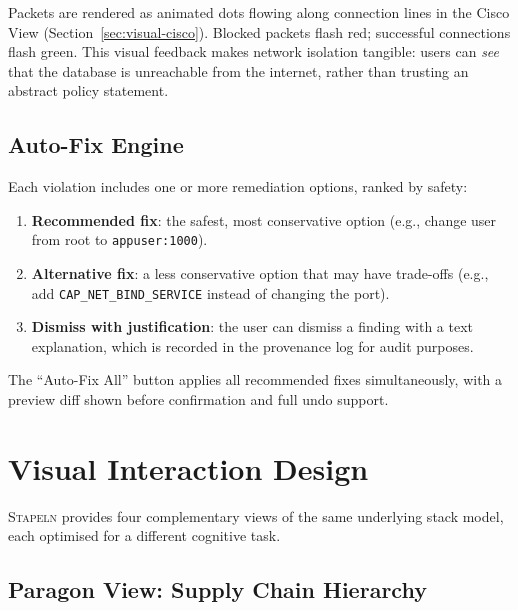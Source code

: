 \documentclass[11pt,twocolumn]{article}
\newcommand{\stapeln}{\textsc{Stapeln}\xspace}
\begin{document}
Packets are rendered as animated dots flowing along connection lines
in the Cisco View (Section~\ref{sec:visual-cisco}). Blocked packets
flash red; successful connections flash green. This visual feedback
makes network isolation tangible: users can \emph{see} that the
database is unreachable from the internet, rather than trusting an
abstract policy statement.

\subsection{Auto-Fix Engine}
\label{sec:gap-autofix}

Each violation includes one or more remediation options, ranked by
safety:

\begin{enumerate}[leftmargin=*,noitemsep]
\item \textbf{Recommended fix}: the safest, most conservative option
      (e.g., change user from root to \texttt{appuser:1000}).
\item \textbf{Alternative fix}: a less conservative option that may
      have trade-offs (e.g., add \texttt{CAP\_NET\_BIND\_SERVICE}
      instead of changing the port).
\item \textbf{Dismiss with justification}: the user can dismiss
      a finding with a text explanation, which is recorded in the
      provenance log for audit purposes.
\end{enumerate}

The ``Auto-Fix All'' button applies all recommended fixes
simultaneously, with a preview diff shown before confirmation and
full undo support.


\section{Visual Interaction Design}
\label{sec:visual}

\stapeln provides four complementary views of the same underlying stack
model, each optimised for a different cognitive task.

\subsection{Paragon View: Supply Chain Hierarchy}
\label{sec:visual-paragon}
\end{document}
